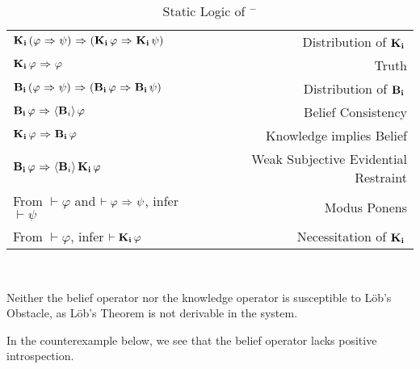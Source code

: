 \begin{table}[H]
	\begin{center}
		\begin{tabular}{| l r |}
			\hline
			$\mathbf{K}_{\mathbf{i}}\,(\varphi {\ \Rightarrow \ } \psi) {\ \Rightarrow \ } (\mathbf{K}_{\mathbf{i}}\,\varphi {\ \Rightarrow \ } \mathbf{K}_{\mathbf{i}}\,\psi)$ & Distribution of $\mathbf{K}_{\mathbf{i}}\,$ \\
			$\mathbf{K}_{\mathbf{i}}\,\varphi {\ \Rightarrow \ } \varphi$ & Truth \\
			$\mathbf{B}_{\mathbf{i}}\,(\varphi {\ \Rightarrow \ } \psi) {\ \Rightarrow \ } (\mathbf{B}_{\mathbf{i}}\,\varphi {\ \Rightarrow \ } \mathbf{B}_{\mathbf{i}}\,\psi)$ & Distribution of $\mathbf{B}_{\mathbf{i}}\,$\\
			$\mathbf{B}_{\mathbf{i}}\,\varphi {\ \Rightarrow \ } \langle \mathbf{B}_{i} \rangle\,\varphi$ & Belief Consistency \\
			$\mathbf{K}_{\mathbf{i}}\,\varphi {\ \Rightarrow \ } \mathbf{B}_{\mathbf{i}}\,\varphi$ & Knowledge implies Belief \\
			$\mathbf{B}_{\mathbf{i}}\,\varphi {\ \Rightarrow \ } \langle \mathbf{B}_{i} \rangle\,\mathbf{K}_{\mathbf{i}}\,\varphi$ & Weak Subjective Evidential Restraint\\
			From $\vdash \varphi$ and $\vdash \varphi {\ \Rightarrow \ } \psi$, infer $\vdash\psi$ & Modus Ponens\\
			From $\vdash \varphi$, infer $\vdash \mathbf{K}_{\mathbf{i}}\,\varphi$ & Necessitation of $\mathbf{K}_{\mathbf{i}}\,$\\
			\hline
		\end{tabular}
		\caption{Static Logic of \DASL$^-$}~\label{GC_agent}
	\end{center}
\end{table}

Neither the belief operator nor the knowledge operator is susceptible to L\"ob's Obstacle, as L\"ob's Theorem is not derivable in the system.

In the counterexample below, we see that the belief operator lacks positive introspection.

